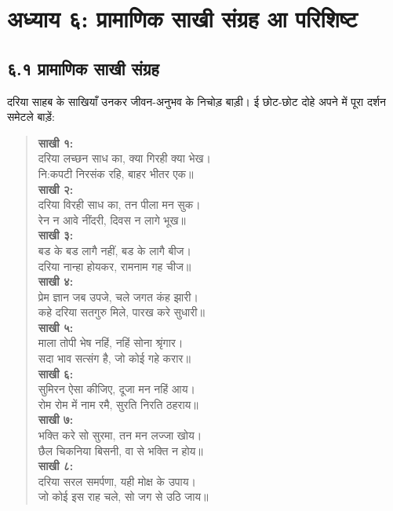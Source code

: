
\cleardoublepage
\section*{अध्याय ६: प्रामाणिक साखी संग्रह आ परिशिष्ट}

\subsection*{६.१ प्रामाणिक साखी संग्रह}

{\small\color{labelcolor}
दरिया साहब के साखियाँ उनकर जीवन-अनुभव के निचोड़ बाड़ी। ई छोट-छोट दोहे अपने में पूरा दर्शन समेटले बाड़ें:
}

\vspace{0.8em}

\begin{quote}
\textbf{साखी १:}\\[0.2em]
दरिया लच्छन साध का, क्या गिरही क्या भेख।\\
नि:कपटी निरसंक रहि, बाहर भीतर एक॥
\\[0.8em]
\textbf{साखी २:}\\[0.2em]
दरिया विरही साध का, तन पीला मन सुक।\\
रेन न आवे नींदरी, दिवस न लागे भूख॥
\\[0.8em]
\textbf{साखी ३:}\\[0.2em]
बड के बड लागै नहीं, बड के लागै बीज।\\
दरिया नान्हा होयकर, रामनाम गह चीज॥
\\[0.8em]
\textbf{साखी ४:}\\[0.2em]
प्रेम ज्ञान जब उपजे, चले जगत कंह झारी।\\
कहे दरिया सतगुरु मिले, पारख करे सुधारी॥
\\[0.8em]
\textbf{साखी ५:}\\[0.2em]
माला तोपी भेष नहिं, नहिं सोना श्रृंगार।\\
सदा भाव सत्संग है, जो कोई गहे करार॥
\\[0.8em]
\textbf{साखी ६:}\\[0.2em]
सुमिरन ऐसा कीजिए, दूजा मन नहिं आय।\\
रोम रोम में नाम रमै, सुरति निरति ठहराय॥
\\[0.8em]
\textbf{साखी ७:}\\[0.2em]
भक्ति करे सो सुरमा, तन मन लज्जा खोय।\\
छैल चिकनिया बिसनी, वा से भक्ति न होय॥
\\[0.8em]
\textbf{साखी ८:}\\[0.2em]
दरिया सरल समर्पणा, यही मोक्ष के उपाय।\\
जो कोई इस राह चले, सो जग से उठि जाय॥
\end{quote}

